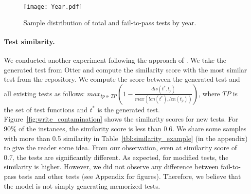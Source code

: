 \begin{figure}[t]
    \centering
    \texttt{[image: Year.pdf]}
    \vspace{-15pt}
    \caption{Sample distribution of total and fail-to-pass tests by year.}
    \label{fig:year}
\end{figure}


\paragraph{Test similarity.}

We conducted another experiment following the approach of
\citet{schafer2023empirical}. We take the generated test from Otter and compute
the similarity score with the most similar test from the repository. We compute
the score between the generated test and all existing tests as follows: $max_{tp
  \in TP}(1-\frac{dis(t^{*},t_{p})}{max(len(t^{*}),len(t_{p}))})$, where $TP$ is
the set of test functions and $t^*$ is the generated test.
Figure~\ref{fig:write_contamination} shows the similarity scores for new
tests. For 90\% of the instances, the similarity score is less than 0.6. We
share some samples with more than 0.5 similarity in
Table~\ref{tbl:similarity_example} (in the appendix) to give the reader some
idea. From our observation, even at similarity score of 0.7, the tests are
significantly different. As expected, for modified tests, the similarity is
higher. However, we did not observe any difference between fail-to-pass tests
and other tests (see Appendix for figures). Therefore, we believe that the model
is not simply generating memorized tests.


